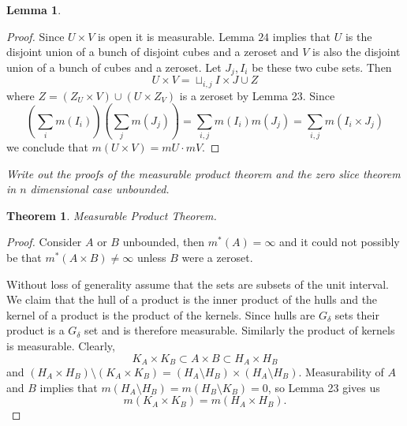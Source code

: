 \documentclass[letter]{article}
\newtheorem{theorem}{Theorem}
\newtheorem{lemma}{Lemma}
\newenvironment{menumerate}{%
  \edef\backupindent{\the\parindent}%
  \enumerate%
  \setlength{\parindent}{\backupindent}%
}{\endenumerate}
\begin{document}
\begin{menumerate}
\begin{lemma}
    \end{lemma}
    \begin{proof}
        Since $U \times V$ is open it is measurable. Lemma $24$ implies that $U$ is the disjoint union of
        a bunch of disjoint cubes and a zeroset and $V$ is also the disjoint union of a bunch of cubes
        and a zeroset. Let $J_j, I_i$ be these two cube sets.
        Then
        \begin{equation}
            U \times V = \sqcup_{i,j} I \times J \cup Z       
        \end{equation}
        where $Z = (Z_U \times V) \cup (U \times Z_V)$ is a zeroset by Lemma 23. Since
        \begin{equation}
            \left(\sum_i m(I_i)\right) \left(\sum_j m(J_j)\right) = \sum_{i,j}m(I_i)m(J_j) = \sum_{i,j} m(I_i \times J_j)
        \end{equation}
        we conclude that $m(U\times V) = mU \cdot mV.$
    \end{proof}
    \item \emph{Write out the proofs of the measurable product theorem and the zero slice theorem in $n$ dimensional case unbounded.}
    \begin{theorem}
    Measurable Product Theorem.
    \end{theorem}
    \begin{proof}
        Consider $A$ or $B$ unbounded, then $m^*(A) = \infty$ and it could not possibly be that $m^*(A\times B) \neq \infty$
        unless $B$ were a zeroset.

        Without loss of generality assume that the sets are subsets of the unit interval. We claim that the hull of a product is 
        the inner product of the hulls and the kernel of a product is the product of the kernels. Since hulls are $G_\delta$ 
        sets their product is a $G_\delta$ set and is therefore measurable. Similarly the product of kernels is measurable. Clearly,
        \begin{equation}
            K_A \times K_B \subset A \times B \subset H_A \times H_B
           \end{equation}   
           and $(H_A \times H_B) \setminus (K_A \times K_B) = (H_A \setminus H_B) \times (H_A \setminus H_B).$
           Measurability of $A$ and $B$ implies that $m(H_A \setminus H_B) = m(H_B \setminus K_B) = 0$, so Lemma 23
           gives us
           \begin{equation}
                m(K_A \times K_B) = m(H_A \times H_B).          
           \end{equation}


\end{proof}
\end{menumerate}
\end{document}
